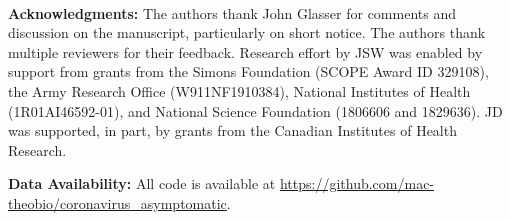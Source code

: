 \mbox{}\\
\noindent
\textbf{Acknowledgments:} The authors thank John Glasser for comments
and discussion on the manuscript, particularly on short notice. 
The authors thank multiple reviewers for their feedback.
Research effort by JSW was enabled
by support from grants from the Simons Foundation (SCOPE Award ID 329108), the Army Research
Office (W911NF1910384), National Institutes of Health (1R01AI46592-01),
and National Science Foundation (1806606 and 1829636). JD was supported, in part, by
grants from the Canadian Institutes of Health Research.

\noindent
\textbf{Data Availability:} All code is available at \url{https://github.com/mac-theobio/coronavirus_asymptomatic}.
